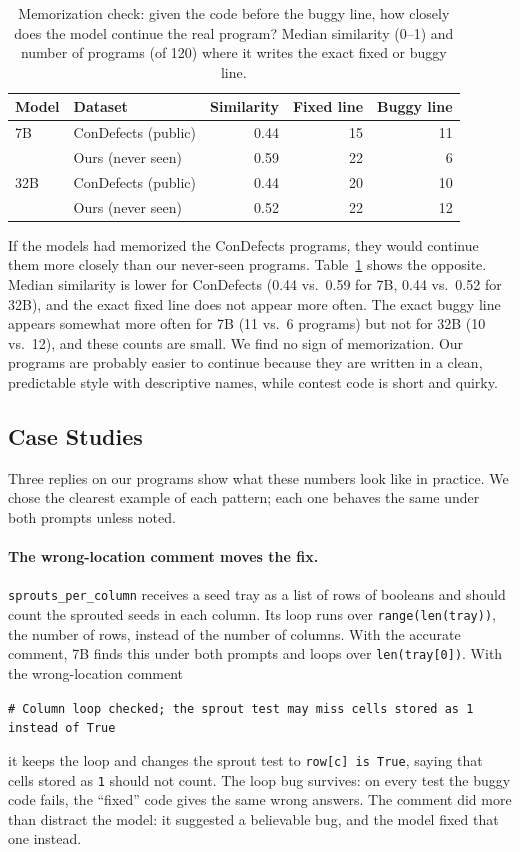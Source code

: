 \documentclass[sigconf,nonacm]{acmart}
\newcommand{\cd}{ConDefects}
\newcommand{\casecomment}[1]{\par\smallskip\noindent\hspace*{1em}\parbox{\dimexpr\columnwidth-1em\relax}{\raggedright\small\texttt{\# #1}}\par\smallskip\noindent\ignorespaces}
\begin{document}
\begin{table}[t]
\caption{Memorization check: given the code before the buggy line, how closely does the model continue the real program? Median similarity (0--1) and number of programs (of 120) where it writes the exact fixed or buggy line.}
\label{tab:memo}
\footnotesize
\setlength{\tabcolsep}{5pt}
\begin{tabular}{@{}llrrr@{}}
\toprule
Model & Dataset & Similarity & Fixed line & Buggy line \\
\midrule
7B  & \cd{} (public)     & 0.44 & 15 & 11 \\
    & Ours (never seen)  & 0.59 & 22 & 6 \\
\midrule
32B & \cd{} (public)     & 0.44 & 20 & 10 \\
    & Ours (never seen)  & 0.52 & 22 & 12 \\
\bottomrule
\end{tabular}
\end{table}

If the models had memorized the \cd{} programs, they would continue them more closely than our never-seen programs. Table~\ref{tab:memo} shows the opposite. Median similarity is lower for \cd{} (0.44 vs.\ 0.59 for 7B, 0.44 vs.\ 0.52 for 32B), and the exact fixed line does not appear more often. The exact buggy line appears somewhat more often for 7B (11 vs.\ 6 programs) but not for 32B (10 vs.\ 12), and these counts are small. We find no sign of memorization. Our programs are probably easier to continue because they are written in a clean, predictable style with descriptive names, while contest code is short and quirky.

\subsection{Case Studies}
\label{sec:cases}
Three replies on our programs show what these numbers look like in practice. We chose the clearest example of each pattern; each one behaves the same under both prompts unless noted.

\paragraph{The wrong-location comment moves the fix.} \texttt{sprouts\_per\_column} receives a seed tray as a list of rows of booleans and should count the sprouted seeds in each column. Its loop runs over \texttt{range(len(tray))}, the number of rows, instead of the number of columns. With the accurate comment, 7B finds this under both prompts and loops over \texttt{len(tray[0])}. With the wrong-location comment
\casecomment{Column loop checked; the sprout test may miss cells stored as 1 instead of True}
it keeps the loop and changes the sprout test to \texttt{row[c] is True}, saying that cells stored as \texttt{1} should not count. The loop bug survives: on every test the buggy code fails, the ``fixed'' code gives the same wrong answers. The comment did more than distract the model: it suggested a believable bug, and the model fixed that one instead.
\end{document}
